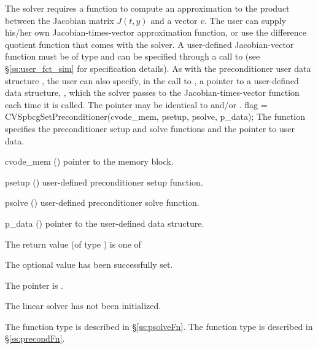 The 
{\cvspbcg} solver requires a function to compute an approximation to the
product between the Jacobian matrix $J(t,y)$ and a vector $v$.
The user can supply his/her own Jacobian-times-vector approximation function, 
or use the difference quotient function  
that comes with the {\cvspbcg} solver.
A user-defined Jacobian-vector function must be of type  and 
can be specified through a call to  
(see \S\ref{ss:user_fct_sim} for specification details).
As with the preconditioner user data structure , 
the user can also specify, in the call to , a pointer to a 
user-defined data structure, , which
the {\cvspbcg} solver passes to the Jacobian-times-vector function 
each time it is called.  
The pointer  may be identical to  and/or .
{
  flag = CVSpbcgSetPreconditioner(cvode\_mem, psetup, psolve, p\_data);
}
{
  The function  specifies the preconditioner
  setup and solve functions and the pointer to user data.
}
{
  \begin{args}
  \item[cvode\_mem] ()
    pointer to the {\cvode} memory block.
  \item[psetup] ()
    user-defined preconditioner setup function.
  \item[psolve] ()
    user-defined preconditioner solve function.
  \item[p\_data] ()
     pointer to the user-defined data structure.
  \end{args}
}
{
  The return value  (of type ) is one of
  \begin{args}
  \item[\Id{CVSPBCG\_SUCCESS}] 
    The optional value has been successfully set.
  \item[\Id{CVSPBCG\_MEM\_NULL}]
    The  pointer is .
  \item[\Id{CVSPBCG\_LMEM\_NULL}]
    The {\cvspbcg} linear solver has not been initialized.
  \end{args}
}
{
   The function type  is described in \S\ref{ss:psolveFn}.
   The function type  is described in \S\ref{ss:precondFn}.
}
